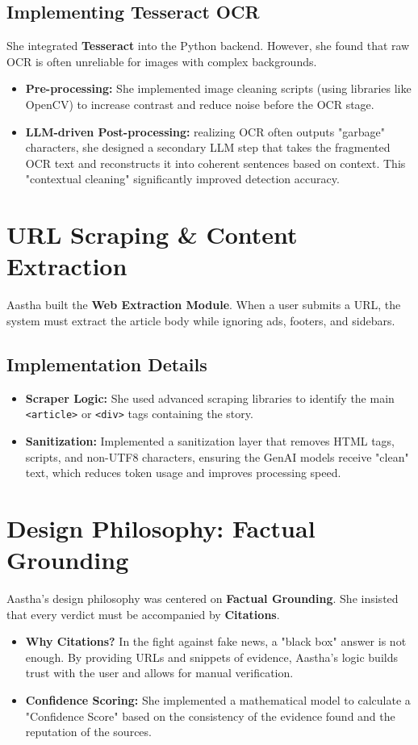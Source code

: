 \documentclass[12pt]{article}
\begin{document}
\subsection{Implementing Tesseract OCR}
She integrated \textbf{Tesseract} into the Python backend. However, she found that raw OCR is often unreliable for images with complex backgrounds. 
\begin{itemize}
    \item \textbf{Pre-processing:} She implemented image cleaning scripts (using libraries like OpenCV) to increase contrast and reduce noise before the OCR stage.
    \item \textbf{LLM-driven Post-processing:} realizing OCR often outputs "garbage" characters, she designed a secondary LLM step that takes the fragmented OCR text and reconstructs it into coherent sentences based on context. This "contextual cleaning" significantly improved detection accuracy.
\end{itemize}

\section{URL Scraping & Content Extraction}
Aastha built the \textbf{Web Extraction Module}. When a user submits a URL, the system must extract the article body while ignoring ads, footers, and sidebars.

\subsection{Implementation Details}
\begin{itemize}
    \item \textbf{Scraper Logic:} She used advanced scraping libraries to identify the main \texttt{<article>} or \texttt{<div>} tags containing the story.
    \item \textbf{Sanitization:} Implemented a sanitization layer that removes HTML tags, scripts, and non-UTF8 characters, ensuring the GenAI models receive "clean" text, which reduces token usage and improves processing speed.
\end{itemize}

\section{Design Philosophy: Factual Grounding}
Aastha's design philosophy was centered on \textbf{Factual Grounding}. She insisted that every verdict must be accompanied by \textbf{Citations}.
\begin{itemize}
    \item \textbf{Why Citations?} In the fight against fake news, a "black box" answer is not enough. By providing URLs and snippets of evidence, Aastha’s logic builds trust with the user and allows for manual verification.
    \item \textbf{Confidence Scoring:} She implemented a mathematical model to calculate a "Confidence Score" based on the consistency of the evidence found and the reputation of the sources.
\end{itemize}
\end{document}
